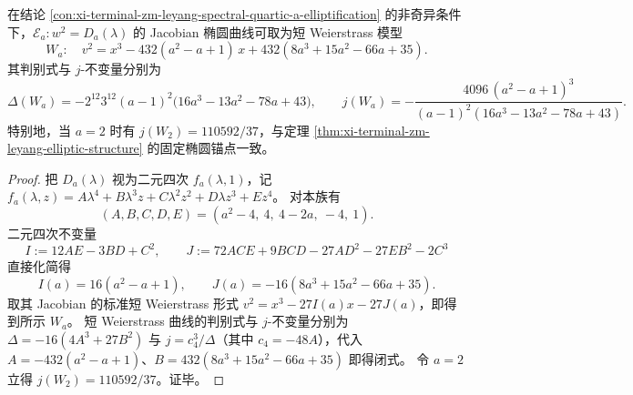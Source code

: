 \begin{conclusion}\label{con:xi-terminal-zm-leyang-spectral-quartic-a-weierstrass-j}
在结论 \ref{con:xi-terminal-zm-leyang-spectral-quartic-a-elliptification} 的非奇异条件下，\(\mathcal E_a:w^2=D_a(\lambda)\) 的 Jacobian 椭圆曲线可取为短 Weierstrass 模型
\[
W_a:\quad v^2=x^3-432(a^2-a+1)\,x+432(8a^3+15a^2-66a+35).
\]
其判别式与 \(j\)-不变量分别为
\[
\Delta(W_a)=-2^{12}3^{12}(a-1)^2\bigl(16a^3-13a^2-78a+43\bigr),
\qquad
j(W_a)= -\frac{4096\,(a^2-a+1)^3}{(a-1)^2(16a^3-13a^2-78a+43)}.
\]
特别地，当 \(a=2\) 时有 \(j(W_2)=110592/37\)，与定理 \ref{thm:xi-terminal-zm-leyang-elliptic-structure} 的固定椭圆锚点一致。
\end{conclusion}
\begin{proof}
把 \(D_a(\lambda)\) 视为二元四次 \(f_a(\lambda,1)\)，记
\(
f_a(\lambda,z)=A\lambda^4+B\lambda^3 z+C\lambda^2 z^2+D\lambda z^3+Ez^4
\)。
对本族有
\[
(A,B,C,D,E)=(a^2-4,\ 4,\ 4-2a,\ -4,\ 1).
\]
二元四次不变量
\[
I:=12AE-3BD+C^2,\qquad
J:=72ACE+9BCD-27AD^2-27EB^2-2C^3
\]
直接化简得
\[
I(a)=16(a^2-a+1),\qquad J(a)=-16(8a^3+15a^2-66a+35).
\]
取其 Jacobian 的标准短 Weierstrass 形式 \(v^2=x^3-27I(a)x-27J(a)\)，即得到所示 \(W_a\)。
短 Weierstrass 曲线的判别式与 \(j\)-不变量分别为
\(
\Delta=-16(4A^3+27B^2)
\)
与 \(j=c_4^3/\Delta\)（其中 \(c_4=-48A\)），代入 \(A=-432(a^2-a+1)\)、\(B=432(8a^3+15a^2-66a+35)\) 即得闭式。
令 \(a=2\) 立得 \(j(W_2)=110592/37\)。证毕。
\end{proof}

